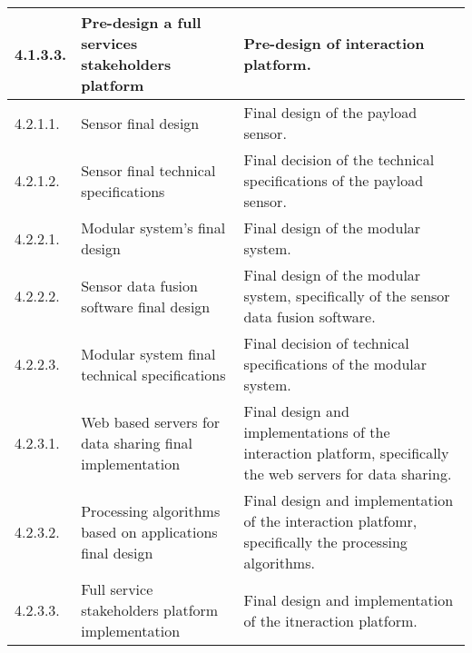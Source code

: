 \begin{longtable}[H]{l >{\raggedright\arraybackslash}p{4cm} p{8cm}}
	\midrule
	
	4.1.3.3. & Pre-design a full services stakeholders platform & Pre-design of interaction platform.\vspace{0.2cm} \\
	
	\midrule
	
	4.2.1.1. & Sensor final design & Final design of the payload sensor.\vspace{0.2cm} \\
	
	\midrule
	
	4.2.1.2. & Sensor final technical specifications & Final decision of the technical specifications of the payload sensor.\vspace{0.2cm} \\
	
	\midrule
	
	4.2.2.1. & Modular system's final design & Final design of the modular system.\vspace{0.2cm} \\
	
	\midrule
	
	4.2.2.2. & Sensor data fusion software final design  & Final design of the modular system, specifically of the sensor data fusion software.\vspace{0.2cm} \\
	
	\midrule
	
	4.2.2.3. & Modular system final technical specifications & Final decision of technical specifications of the modular system.\vspace{0.2cm} \\

	\midrule
	
	4.2.3.1. & Web based servers for data sharing final implementation & Final design and implementations of the interaction platform, specifically the web servers for data sharing.\vspace{0.2cm} \\
	
	\midrule
	
	4.2.3.2. & Processing algorithms based on applications final design & Final design and implementation of the interaction platfomr, specifically the processing algorithms.\vspace{0.2cm} \\
	
	\midrule
	
	4.2.3.3. & Full service stakeholders platform implementation & Final design and implementation of the itneraction platform.\vspace{0.2cm} \\
	

\end{longtable}
